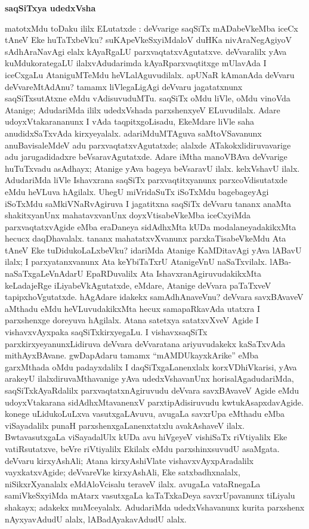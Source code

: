 \bigskip
\begin{center}
{\Large\bf saqSiTxya udedxVsha}
\end{center}

matotxMdu toDaku ililx ELutatxde : deVvarige saqSiTx mADabeVkeMba iceCx tAneV Eke huTaTxbeVku? suKApeVkeSxyiMdaloV duHKa nivAraNegAgiyoV sAdhAraNavAgi elalx kAyaRgaLU parxvaqtatxvAgutatxve. deVvaralilx yAva kuMdukorategaLU ilalxvAdudarimda kAyaRparxvaqtitxge mUlavAda I iceCxgaLu AtaniguMTeMdu heVLalAguvudilalx. apUNaR kAmanAda deVvaru deVvareMtAdAnu? tamamx liVlegaLigAgi deVvaru jagatatxnunx saqSiTxsutAtxne eMdu vAdisuvuduMTu. saqSiTx oMdu liVle, oMdu vinoVda Atanige; AdudariMda ililx udedxVshada parxshenxyeV ELuvudilalx. Adare udoyxVtakarananunx I vAda taqpitxgoLisadu, EkeMdare liVle saha anudidxSaTxvAda kirxyeyalalx. adariMduMTAguva saMtoVSavanunx anuBavisaleMdeV adu parxvaqtatxvAgutatxde; alalxde ATakokxlidiruvavarige adu jarugadidadxre beVsaravAgutatxde. Adare iMtha manoVBAva deVvarige huTuTxvadu asAdhayx; Atanige yAva bageya beVsaravU ilalx. kelxVshavU ilalx. AdudariMda liVle Ishavxrana saqSiTx parxvaqtitxyanunx parxcoVdisutatxde eMdu heVLuva hAgilalx. UhegU miVridaSuTx iSoTxMdu bagebageyAgi iSoTxMdu saMkiVNaRvAgiruva I jagatitxna saqSiTx deVvaru tananx anaMta shakitxyanUnx mahatavxvanUnx doyxVtisabeVkeMba iceCxyiMda parxvaqtatxvAgide eMba eraDaneya sidAdhxMta kUDa modalaneyadakikxMta hecucx daqDhavalalx. tananx mahatatxvXvanunx parxkaTisabeVkeMdu Ata tAneV Eke tuDidukoLaLxbeVku? idariMda Atanige KaMDitavAgi yAva lABavU ilalx; I parxyatanxvanunx Ata keYbiTaTxrU AtanigeVnU naSaTxvilalx. lABa-naSaTxgaLeVnAdarU EpaRDuvalilx Ata IshavxranAgiruvudakikxMta keLadajeRge iLiyabeVkAgutatxde, eMdare, Atanige deVvara paTaTxveV tapipxhoVgutatxde. hAgAdare idakekx samAdhAnaveVnu? deVvara savxBAvaveV aMthadu eMdu heVLuvudakikxMta hecux samapaRkavAda utatxra I parxshenxge doreyuva hAgilalx. Atana satetxya satatxvXveV Agide I vishavxvAyxpaka saqSiTxkirxyegaLu. I vishavxsaqSiTx parxkirxyeyanunxLidiruva deVvara deVvaratana ariyuvudakekx kaSaTxvAda mithAyxBAvane. gwDapAdaru tamamx ``mAMDUkayxkArike'' eMba garxMthada oMdu padayxdalilx I daqSiTxgaLanenxlalx korxVDhiVkarisi, yAva arakeyU ilalxdiruvaMthavanige yAva udedxVshavanUnx horisalAgadudariMda, saqSiTxkAyaRdalilx parxvaqtatxnAgiruvudu deVvara savxBAvaveV Agide eMdu udoyxVtakarana sidAdhxMtavanenxV parxtipAdisiruvudu kwtukAsapxdavAgide. konege uLidukoLuLxva vasutxgaLAvuvu, avugaLa savxrUpa eMthadu eMba viSayadalilx punaH parxshenxgaLanenxtatxlu avakAshaveV ilalx. BwtavasutxgaLa viSayadalUlx kUDa avu hiVgeyeV vishiSaTx riVtiyalilx Eke vatiRsutatxve, beVre riVtiyalilx Ekilalx eMdu parxshinxsuvudU asaMgata. deVvaru kirxyAshAli; Atana kirxyAshiVlate vishavxvAyxpAradalilx vayxkatxvAgide; deVvareVke kirxyAshAli, Eke satxbadhxnalalx, niSikxrXyanalalx eMdAloVcisalu teraveV ilalx. avugaLa vataRnegaLa samiVkeSxyiMda mAtarx vasutxgaLa kaTaTxkaDeya savxrUpavanunx tiLiyalu shakayx; adakekx muMceyalalx. AdudariMda udedxVshavanunx kurita parxshenx nAyxyavAdudU alalx, lABadAyakavAdudU alalx.

